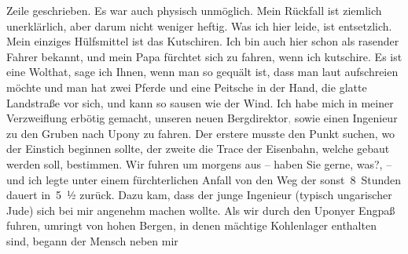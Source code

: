 \begin{ledgroupsized}[t]{13cm}
               Zeile geschrieben. Es war auch physisch unmöglich. Mein Rückfall ist ziemlich
               unerklärlich, aber darum nicht weniger heftig. Was ich hier leide, ist entsetzlich. Mein einziges
               Hülfsmittel ist das Kutschiren. Ich bin auch hier schon als rasender Fahrer bekannt,
               und mein Papa fürchtet sich
               zu fahren, wenn ich kutschire. Es ist eine Wolthat, sage ich Ihnen, wenn man so
               gequält ist, dass man laut aufschreien möchte und man hat zwei Pferde und eine
               Peitsche in der Hand, die glatte Landstraße vor sich, und kann so sausen wie der
               Wind. Ich habe mich in meiner Verzweiflung erbötig gemacht, unseren neuen Bergdirektor\textcolor{gray}{,} sowie einen Ingenieur zu den Gruben nach Upony zu
               fahren. Der erstere musste den Punkt suchen, wo der Einstich beginnen sollte, der
               zweite die Trace der Eisenbahn, welche gebaut werden soll, bestimmen. Wir fuhren um  morgens aus – haben Sie gerne, was?,
               – und ich legte unter einem fürchterlichen Anfall von \label{K_L03105-3v}\label{K_L03105-3h} den Weg der sonst 8 Stunden dauert in 5 ½{ }zurück. Dazu kam, dass der
               junge Ingenieur (typisch
                  ungarischer Jude) sich bei
               mir angenehm machen wollte. Als wir durch den Uponyer Engpaß fuhren, umringt von hohen Bergen, in denen mächtige
               Kohlenlager enthalten sind, be{\pb}gann der Mensch neben mir

\end{ledgroupsized}
